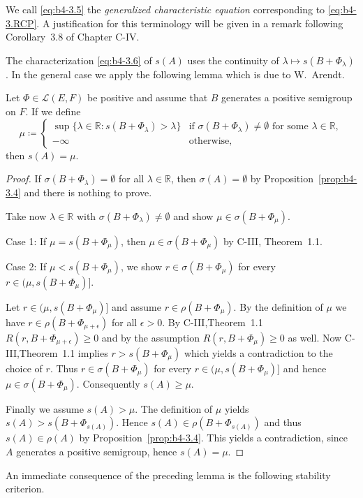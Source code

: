 \begin{remark*}
	We call \eqref{eq:b4-3.5} the \emph{generalized characteristic equation} corresponding to \eqref{eq:b4-3.RCP}. 
	A justification for this terminology will be given in a remark following Corollary~3.8 of Chapter C-IV.
\end{remark*}
The characterization \eqref{eq:b4-3.6} of $s(A)$ uses the continuity of $\lambda \mapsto s(B + \Phi_{\lambda})$. 
In the general case we apply the following lemma which is due to W.~Arendt.
\begin{lemma*} 
	Let  $\Phi \in \mathcal{L}(E,F)$  be positive and assume that  $B$ generates a positive semigroup on  $F$. 
	If we define
	\[
	\mu \coloneq 
	\begin{cases}
		\sup\{\lambda \in \mathbb{R} \colon s(B+\Phi_{\lambda}) > \lambda\} & \text{if } \sigma(B+\Phi_{\lambda}) \neq \emptyset \text{ for some } \lambda \in \mathbb{R}, \\
		-\infty & \text{otherwise},
	\end{cases}
	\]
	then  $s(A) = \mu$.
\end{lemma*}	
\begin{proof}
If $\sigma(B+\Phi_{\lambda}) = \emptyset$ for all $\lambda \in \mathbb{R}$, then $\sigma(A) = \emptyset$ by Proposition~\ref{prop:b4-3.4} and there is nothing to prove.

Take now $\lambda \in \mathbb{R}$ with $\sigma(B+\Phi_{\lambda}) \neq \emptyset$ and show $\mu \in \sigma(B+\Phi_{\mu})$.

Case 1: If $\mu = s(B+\Phi_{\mu})$, then $\mu \in \sigma(B+\Phi_{\mu})$ by C-III, Theorem~1.1.

Case 2: If $\mu < s(B+\Phi_{\mu})$, we show $r \in \sigma(B+\Phi_{\mu})$ for every $r \in (\mu,s(B+\Phi_{\mu})]$.

Let $r \in (\mu,s(B+\Phi_{\mu})]$ and assume $r \in \rho(B+\Phi_{\mu})$. 
By the definition of $\mu$ we have $r \in \rho(B+\Phi_{\mu+\epsilon})$ for all $\epsilon > 0$. 
By C-III,Theorem~1.1 $R(r,B+\Phi_{\mu+\epsilon}) \geq 0$ and by the assumption $R(r,B+\Phi_{\mu}) \geq 0$ as well. 
Now C-III,Theorem~1.1 implies $r > s(B+\Phi_{\mu})$ which yields a contradiction to the choice of $r$. 
Thus $r \in \sigma(B+\Phi_{\mu})$ for every $r \in (\mu,s(B+\Phi_{\mu})]$ and hence $\mu \in \sigma(B+\Phi_{\mu})$. 
Consequently $s(A) \geq \mu$.

Finally we assume $s(A) > \mu$. 
The definition of $\mu$ yields $s(A) > s(B+\Phi_{s(A)})$. 
Hence $s(A) \in \rho(B+\Phi_{s(A)})$ and thus $s(A) \in \rho(A)$ by Proposition~\ref{prop:b4-3.4}. 
This yields a contradiction, since $A$ generates a positive semigroup, hence $s(A) = \mu$.
\end{proof}
An immediate consequence of the preceding lemma is the following stability criterion.

